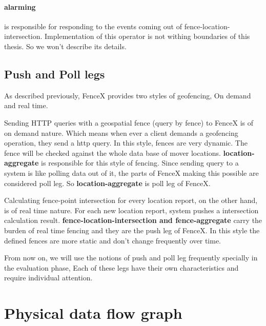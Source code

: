 \documentclass[a4]{report}
\begin{document}
    \paragraph{alarming} is responsible for responding to the events coming out of fence-location-intersection.
    Implementation of this operator is not withing boundaries of this thesis. So we won't describe its details.

    \subsection{Push and Poll legs}
    As described previously, FenceX provides two styles of geofencing, On demand and real time.

    Sending HTTP queries with a geospatial fence (query by fence) to FenceX is of on demand nature.
    Which means when ever a client demands a geofencing operation, they send a http query. In this style, fences are very dynamic.
    The fence will be checked against the whole data base of mover locations.
    \textbf{location-aggregate} is responsible for this style of fencing.
    Since sending query to a system is like polling data out of it, the parts of FenceX making this possible are considered poll leg.
    So \textbf{location-aggregate} is poll leg of FenceX.

    Calculating fence-point intersection for every location report, on the other hand, is of real time nature.
    For each new location report, system pushes a intersection calculation result.
    \textbf{fence-location-intersection and fence-aggregate} carry the burden of real time fencing and they are the push leg of FenceX.
    In this style the defined fences are more static and don't change frequently over time.

    From now on, we will use the notions of push and poll leg frequently specially in the evaluation phase, Each of these legs have their own characteristics and require individual attention.


    \section{Physical data flow graph}
\end{document}
